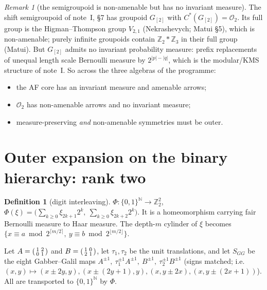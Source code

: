 \documentclass[11pt]{article}
\theoremstyle{definition}
\newtheorem{definition}[theorem]{Definition}
\theoremstyle{remark}
\newtheorem{remark}[theorem]{Remark}
\newcommand{\Z}{\mathbb Z}
\newcommand{\N}{\mathbb N}
\begin{document}
\begin{remark}[the semigroupoid is non-amenable but has no invariant measure]
The shift semigroupoid of note~I, \S7 has groupoid $G_{[2]}$ with $C^*(G_{[2]})=\mathcal O_2$. Its full group is the Higman--Thompson group $V_{2,1}$ (Nekrashevych; Matui \S5), which is non-amenable; purely infinite groupoids contain $\Z_2*\Z_3$ in their full group (Matui). But $G_{[2]}$ admits no invariant probability measure: prefix replacements of unequal length scale Bernoulli measure by $2^{|p|-|q|}$, which is the modular/KMS structure of note~I. So across the three algebras of the programme:
\begin{itemize}
\item the AF core has an invariant measure and amenable arrows;
\item $\mathcal O_2$ has non-amenable arrows and no invariant measure;
\item measure-preserving \emph{and} non-amenable symmetries must be outer.
\end{itemize}
\end{remark}

\section{Outer expansion on the binary hierarchy: rank two}

\begin{definition}[digit interleaving]
$\Phi:\{0,1\}^{\N}\to\Z_2^2$, $\Phi(\xi)=\big(\sum_{k\ge0}\xi_{2k+1}2^k,\ \sum_{k\ge0}\xi_{2k+2}2^k\big)$. It is a homeomorphism carrying fair Bernoulli measure to Haar measure. The depth-$m$ cylinder of $\xi$ becomes $\{x\equiv a\bmod 2^{\lceil m/2\rceil},\ y\equiv b\bmod2^{\lfloor m/2\rfloor}\}$.
\end{definition}

Let $A=\begin{psmallmatrix}1&2\\0&1\end{psmallmatrix}$ and $B=\begin{psmallmatrix}1&0\\2&1\end{psmallmatrix}$, let $\tau_1,\tau_2$ be the unit translations, and let $S_{GG}$ be the eight Gabber--Galil maps $A^{\pm1},\ \tau_1^{\pm1}A^{\pm1},\ B^{\pm1},\ \tau_2^{\pm1}B^{\pm1}$ (signs matched; i.e.\ $(x,y)\mapsto(x\pm2y,y),(x\pm(2y+1),y),(x,y\pm2x),(x,y\pm(2x+1))$). All are transported to $\{0,1\}^{\N}$ by $\Phi$.
\end{document}
